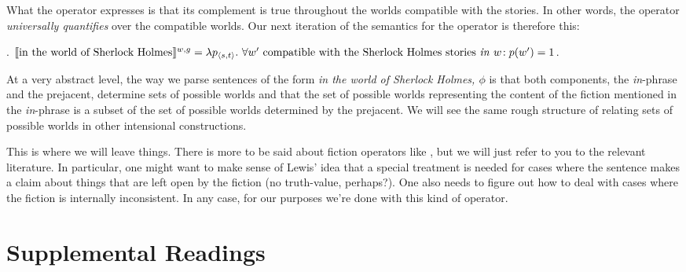 What the operator  expresses is that its complement is true throughout the worlds compatible with the stories. In other words, the operator \emph{universally quantifies} over the compatible worlds. Our next iteration of the semantics for the operator is therefore this:

\ex. $\llbracket \mbox{in the world of Sherlock Holmes} \rrbracket^{w,g} =\\
\lambda p_{\langle s,t \rangle}.\ \forall w' \mbox{ compatible with the Sherlock Holmes stories \emph{in} } w\!:\\
p(w') = 1$.

At a very abstract level, the way we parse sentences of the form \emph{in the world of Sherlock Holmes, $\phi$} is that both components, the \emph{in}-phrase and the prejacent, determine sets of possible worlds and that the set of possible worlds representing the content of the fiction mentioned in the \emph{in}-phrase is a subset of the set of possible worlds determined by the prejacent. We will see the same rough structure of relating sets of possible worlds in other intensional constructions.

This is where we will leave things. There is more to be said about fiction operators like , but we will just refer to you to the relevant literature. In particular, one might want to make sense of Lewis' idea that a special treatment is needed for cases where the sentence makes a claim about things that are left open by the fiction (no truth-value, perhaps?). One also needs to figure out how to deal with cases where the fiction is internally inconsistent. In any case, for our purposes we're done with this kind of operator. 

\section{Supplemental Readings}

